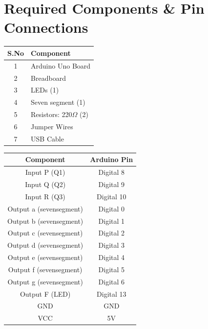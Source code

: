 \documentclass[a4paper,12pt]{article}
\begin{document}
\section*{Required Components \& Pin Connections}
\begin{center}
\begin{minipage}{0.45\textwidth}
\begin{table}[H]
\centering
\begin{tabular}{|c|l|}
\hline
\textbf{S.No} & \textbf{Component} \\ \hline
1 & Arduino Uno Board \\
2 & Breadboard \\
3 & LEDs (1) \\
4 & Seven segment (1) \\
5 & Resistors: 220$\Omega$ (2) \\
6 & Jumper Wires \\
7 & USB Cable \\
\hline
\end{tabular}
\end{table}
\end{minipage}
\hspace{0.05\textwidth}
\begin{minipage}{0.45\textwidth}
\begin{table}[H]
\centering
\begin{tabular}{|c|c|}
\hline
\textbf{Component} & \textbf{Arduino Pin} \\ \hline
Input P (Q1) & Digital 8 \\
Input Q (Q2) & Digital 9 \\
Input R (Q3) & Digital 10 \\
Output a (sevensegment) & Digital 0 \\
Output b (sevensegment) & Digital 1 \\
Output c (sevensegment) & Digital 2 \\
Output d (sevensegment) & Digital 3 \\
Output e (sevensegment) & Digital 4 \\
Output f (sevensegment) & Digital 5 \\
Output g (sevensegment) & Digital 6 \\
Output F (LED) & Digital 13 \\ 
GND & GND \\
VCC & 5V \\
\hline
\end{tabular}
\end{table}
\end{minipage}
\end{center}
\end{document}
